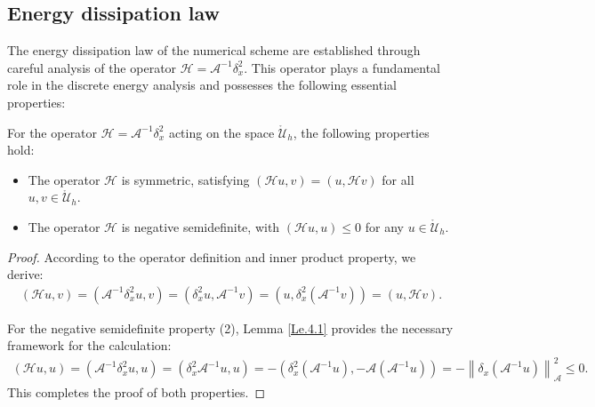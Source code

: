 \documentclass{siamart171218}
\theoremstyle{remark}
\theoremstyle{example}
\numberwithin{equation}{section}
\begin{document}
\subsection{Energy dissipation law}\label{sec: Energy Dissipation Law}
The energy dissipation law of the numerical scheme are established through careful analysis of the operator $\mathcal{H} = \mathscr{A}^{-1}\delta_x^2$. This operator plays a fundamental role in the discrete energy analysis and possesses the following essential properties:
\begin{lemma}\label{Le.4.4}
For the operator $\mathcal{H} = \mathscr{A}^{-1}\delta_x^2$ acting on the space $\mathring{\mathscr{U}}_h$, the following properties hold:
\begin{itemize}
\item[(1)] The operator $\mathcal{H}$ is symmetric, satisfying $(\mathcal{H} u, v) = (u, \mathcal{H} v)$ for all $u, v \in \mathring{\mathscr{U}}_h$.
\item[(2)] The operator $\mathcal{H}$ is negative semidefinite, with $(\mathcal{H} u, u) \leq 0$ for any $u\in \mathring{\mathcal{U}}_h$.
\end{itemize}
\end{lemma}

\begin{proof}
According to the operator definition and inner product property, we derive:
\begin{align*}
\left(\mathcal{H} u, v\right) = \left(\mathcal{A}^{-1}\delta_x^2 u, v\right)
= \left(\delta_x^2 u, \mathcal{A}^{-1} v\right)
= \left(u, \delta_x^2 \left(\mathcal{A}^{-1} v\right)\right)
= \left(u, \mathcal{H} v\right).
\end{align*}

For the negative semidefinite property (2), Lemma \ref{Le.4.1} provides the necessary framework for the calculation:
\begin{align*}
	\left(\mathcal{H} u, u\right) = \left(\mathcal{A}^{-1}\delta_x^2 u, u\right) = \left(\delta_x^2 \mathcal{A}^{-1}u, u\right)
= -\left(\delta_x^2 \left(\mathcal{A}^{-1} u\right),
-\mathcal{A} \left(\mathcal{A}^{-1} u\right)\right)
= -\left\|\delta_x \left(\mathcal{A}^{-1} u\right)\right\|_\mathcal{A}^2 \leq 0.
\end{align*}
This completes the proof of both properties.
\end{proof}
\end{document}
